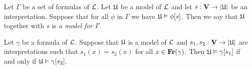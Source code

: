 \begin{definition}
Let $\Gamma$ be a set of formulas of ${\mathcal L}$. Let ${\mathfrak U}$ be a model of ${\mathcal L}$ and let $s: \mathbf{V} \rightarrow |{\mathfrak U}|$ be an interpretation. Suppose that for all $\phi$ in $\Gamma$ we have ${\mathfrak U} \vDash \phi[s]$. Then we say that ${\mathfrak U}$ together with $s$ is \textit{a model for $\Gamma$}.
\end{definition}

\begin{proposition}\label{proposition:only_free_variables_matter_for_interpretation}
Let $\gamma$ be a formula of ${\mathcal L}$. Suppose that ${\mathfrak U}$ is a model of ${\mathcal L}$ and $s_1, s_2: \mathbf{V} \rightarrow |{\mathfrak U}|$ are interpretations such that $s_1(x) = s_2(x)$ for all $x\in \mathbf{Fr}(\gamma)$. Then ${\mathfrak U} \vDash \gamma[s_1]$ if and only if ${\mathfrak U} \vDash \gamma[s_2]$.
\end{proposition}
